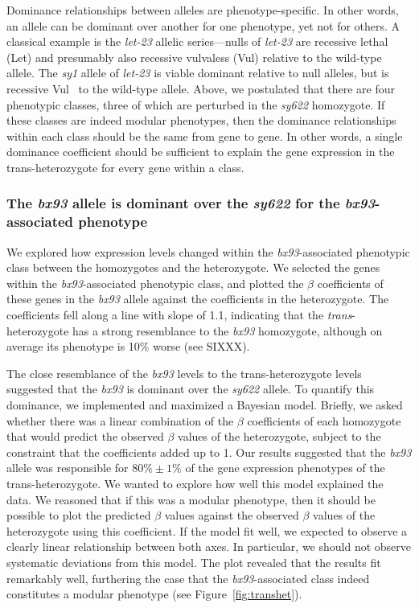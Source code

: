 \documentclass[10pt, onecolumn]{article}
\newcommand{\gene}[1]{\mbox{\emph{#1}}}
\begin{document}
Dominance relationships between alleles are phenotype-specific. In other
words, an allele can be dominant over another for one phenotype, yet not for
others. A classical example is the \gene{let-23} allelic series---nulls of
\gene{let-23} are recessive lethal (Let) and presumably also recessive vulvaless
(Vul) relative to the wild-type allele. The \emph{sy1} allele of
\gene{let-23} is viable dominant relative to null alleles, but is recessive
Vul~\cite{} to the wild-type allele. Above, we postulated that there are four
phenotypic classes, three of which are perturbed in the \emph{sy622} homozygote.
If these classes are indeed modular phenotypes, then the dominance relationships
within each class should be the same from gene to gene. In other words, a single
dominance coefficient should be sufficient to explain the gene expression in the
trans-heterozygote for every gene within a class.

\subsubsection*{The \emph{bx93} allele is dominant over the \emph{sy622} for the
             \emph{bx93}-associated phenotype}

We explored how expression levels changed within the \emph{bx93}-associated
phenotypic class between the homozygotes and the heterozygote. We selected the
genes within the \emph{bx93}-associated phenotypic class, and plotted the
$\beta$ coefficients of these genes in the \emph{bx93} allele against the
coefficients in the heterozygote. The coefficients fell along a line with slope
of 1.1, indicating that the \emph{trans}-heterozygote has a strong resemblance
to the \emph{bx93} homozygote, although on average its phenotype is 10\% worse
(see SIXXX).

The close resemblance of the \emph{bx93} levels to the trans-heterozygote levels
suggested that the \emph{bx93} is dominant over the \emph{sy622} allele. To
quantify this dominance, we implemented and maximized a Bayesian model. Briefly,
we asked whether there was a linear combination of the $\beta$ coefficients
of each homozygote that would predict the observed $\beta$ values of the
heterozygote, subject to the constraint that the coefficients added up to 1.
Our results suggested that the \emph{bx93} allele was responsible for
$80\% \pm 1\%$ of the gene expression phenotypes of the trans-heterozygote.
We wanted to explore how well this model explained the data. We reasoned that
if this was a modular phenotype, then it should be possible to plot the predicted
$\beta$ values against the observed $\beta$ values of the heterozygote using
this coefficient. If the model fit well, we expected to observe a clearly linear
relationship between both axes. In particular, we should not observe systematic
deviations from this model. The plot revealed that the results fit remarkably
well, furthering the case that the \emph{bx93}-associated class indeed constitutes
a modular phenotype (see Figure~\ref{fig:transhet}).
\end{document}

